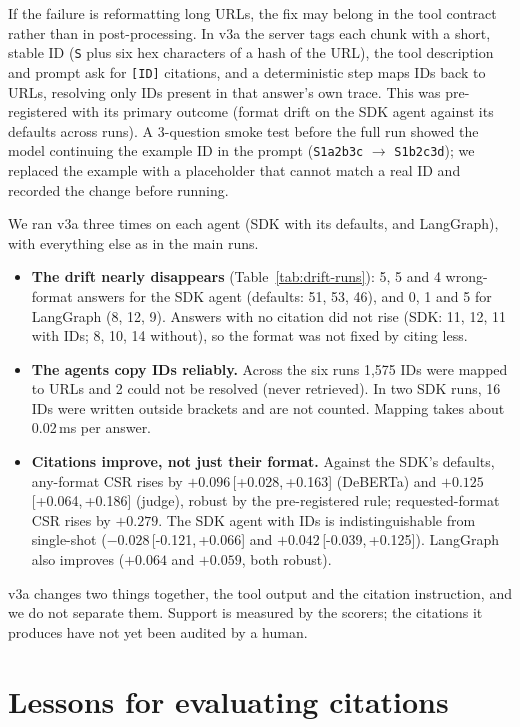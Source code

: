 \documentclass[11pt]{article}
\newcommand{\ci}[2]{\,[#1,\,#2]}
\newcommand{\code}[1]{\texttt{#1}}
\begin{document}
If the failure is reformatting long URLs, the fix may belong in the tool contract rather than in
post-processing. In v3a the server tags each chunk with a short, stable ID (\code{S} plus six hex
characters of a hash of the URL), the tool description and prompt ask for \code{[ID]} citations,
and a deterministic step maps IDs back to URLs, resolving only IDs present in that answer's own
trace. This was pre-registered with its primary outcome (format drift on the SDK agent against
its defaults across runs). A 3-question smoke test before the full run showed the model continuing
the example ID in the prompt (\code{S1a2b3c} $\to$ \code{S1b2c3d}); we replaced the example with
a placeholder that cannot match a real ID and recorded the change before running.

We ran v3a three times on each agent (SDK with its defaults, and LangGraph), with everything else
as in the main runs.

\begin{itemize}
\item \textbf{The drift nearly disappears} (Table~\ref{tab:drift-runs}): 5, 5 and 4 wrong-format
answers for the SDK agent (defaults: 51, 53, 46), and 0, 1 and 5 for LangGraph (8, 12, 9). Answers
with no citation did not rise (SDK: 11, 12, 11 with IDs; 8, 10, 14 without), so the format was not
fixed by citing less.
\item \textbf{The agents copy IDs reliably.} Across the six runs 1,575 IDs were mapped to URLs and
2 could not be resolved (never retrieved). In two SDK runs, 16 IDs were written outside brackets
and are not counted. Mapping takes about 0.02\,ms per answer.
\item \textbf{Citations improve, not just their format.} Against the SDK's defaults, any-format CSR
rises by $+0.096$\ci{+0.028}{+0.163} (DeBERTa) and $+0.125$\ci{+0.064}{+0.186} (judge), robust by
the pre-registered rule; requested-format CSR rises by $+0.279$. The SDK agent with IDs is
indistinguishable from single-shot ($-0.028$\ci{-0.121}{+0.066} and $+0.042$\ci{-0.039}{+0.125}).
LangGraph also improves ($+0.064$ and $+0.059$, both robust).
\end{itemize}

v3a changes two things together, the tool output and the citation instruction, and we do not
separate them. Support is measured by the scorers; the citations it produces have not yet been
audited by a human.

\section{Lessons for evaluating citations}
\label{sec:lessons}
\end{document}
